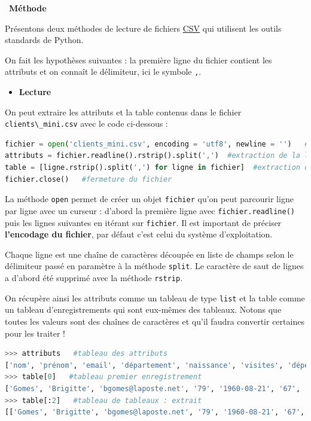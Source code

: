 \documentclass[
  11pt,
]{article}
\newcommand{\passthrough}[1]{#1}
\providecommand{\tightlist}{%
  \setlength{\itemsep}{0pt}\setlength{\parskip}{0pt}}
\newenvironment{methode}[1]
{\par \medskip    \noindent  
 \begin {bclogo}[arrondi =0.1,logo=\bcoutil, marge=4,noborder = true] {~\textbf{Méthode}   {\itshape #1} }  \par}
{
\end{bclogo}
 \par \bigskip }
\begin{document}
\begin{methode}{}

Présentons deux méthodes de lecture de fichiers
\href{https://fr.wikipedia.org/wiki/Comma-separated_values}{CSV} qui
utilisent les outils standards de Python.

On fait les hypothèses suivantes : la première ligne du fichier contient
les attributs et on connaît le délimiteur, ici le symbole
\passthrough{\lstinline!,!}.

\begin{itemize}
\tightlist
\item
  \textbf{Lecture}
\end{itemize}

On peut extraire les attributs et la table contenus dans le fichier
\passthrough{\lstinline!clients\_mini.csv!} avec le code ci-dessous :

\begin{lstlisting}[language=Python]
fichier = open('clients_mini.csv', encoding = 'utf8', newline = '')   #ouverture du fichier
attributs = fichier.readline().rstrip().split(',')  #extraction de la ligne des attributs
table = [ligne.rstrip().split(',') for ligne in fichier]  #extraction des autres lignes
fichier.close()   #fermeture du fichier 
\end{lstlisting}

La méthode \passthrough{\lstinline!open!} permet de créer un objet
\passthrough{\lstinline!fichier!} qu'on peut parcourir ligne par ligne
avec un curseur : d'abord la première ligne avec
\passthrough{\lstinline!fichier.readline()!} puis les lignes suivantes
en itérant sur \passthrough{\lstinline!fichier!}. Il est important de
préciser \textbf{l'encodage du fichier}, par défaut c'est celui du
système d'exploitation.

Chaque ligne est une chaîne de caractères découpée en liste de champs
selon le délimiteur passé en paramètre à la méthode
\passthrough{\lstinline!split!}. Le caractère de saut de lignes a
d'abord été supprimé avec la méthode \passthrough{\lstinline!rstrip!}.

On récupère ainsi les attributs comme un tableau de type
\passthrough{\lstinline!list!} et la table comme un tableau
d'enregistrements qui sont eux-mêmes des tableaux. Notons que toutes les
valeurs sont des chaînes de caractères et qu'il faudra convertir
certaines pour les traiter !

\begin{lstlisting}[language=Python]
>>> attributs   #tableau des attributs
['nom', 'prénom', 'email', 'département', 'naissance', 'visites', 'dépenses']
>>> table[0]   #tableau premier enregistrement 
['Gomes', 'Brigitte', 'bgomes@laposte.net', '79', '1960-08-21', '67', '8342.99']
>>> table[:2]   #tableau de tableaux : extrait 
[['Gomes', 'Brigitte', 'bgomes@laposte.net', '79', '1960-08-21', '67', '8342.99'], ['Nicolas', 'Georges', 'gnicolas@yahoo.fr', '10', '1994-05-26', '86', '10908.08']]
\end{lstlisting}


\end{methode}
\end{document}

